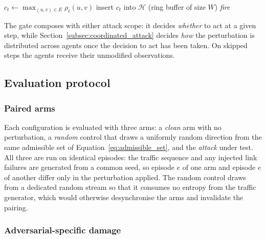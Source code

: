\begin{algorithm}[H]
\SetAlgoLined
\DontPrintSemicolon
{}
$c_t \leftarrow \max_{(u,v) \in E} \rho_t(u,v)$ 
insert $c_t$ into $\mathcal{H}$ (ring buffer of size $W$)\;
\Return \textit{fire}\;
\caption{Critical-state timing gate}
\label{alg:timing_gate}
\end{algorithm}

The gate composes with either attack scope: it decides \emph{whether} to act at a
given step, while Section~\ref{subsec:coordinated_attack} decides \emph{how} the
perturbation is distributed across agents once the decision to act has been taken.
On skipped steps the agents receive their unmodified observations.

\subsection{Evaluation protocol}
\label{subsec:eval_protocol}

\subsubsection*{Paired arms}

Each configuration is evaluated with three arms: a \emph{clean} arm with no
perturbation, a \emph{random} control that draws a uniformly random direction from
the same admissible set of Equation~\eqref{eq:admissible_set}, and the \emph{attack}
under test. All three are run on identical episodes: the traffic sequence and any
injected link failures are generated from a common seed, so episode $e$ of one arm
and episode $e$ of another differ only in the perturbation applied. The random
control draws from a dedicated random stream so that it consumes no entropy from
the traffic generator, which would otherwise desynchronise the arms and invalidate
the pairing.

\subsubsection*{Adversarial-specific damage}


